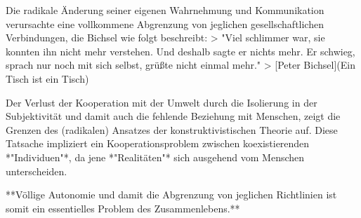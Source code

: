 Die radikale Änderung seiner eigenen Wahrnehmung und Kommunikation verursachte eine vollkommene Abgrenzung von jeglichen gesellschaftlichen Verbindungen, die Bichsel wie folgt beschreibt:
> "Viel schlimmer war, sie konnten ihn nicht mehr verstehen. Und deshalb sagte er nichts mehr. Er schwieg, sprach nur noch mit sich selbst, grüßte nicht einmal mehr."
> [Peter Bichsel](Ein Tisch ist ein Tisch)

Der Verlust der Kooperation mit der Umwelt durch die Isolierung in der Subjektivität und damit auch die fehlende Beziehung mit Menschen, zeigt die Grenzen des (radikalen) Ansatzes der konstruktivistischen Theorie auf.
Diese Tatsache impliziert ein Kooperationsproblem zwischen koexistierenden *"Individuen"*, da jene *"Realitäten"* sich ausgehend vom Menschen unterscheiden.

**Völlige Autonomie und damit die Abgrenzung von jeglichen Richtlinien ist somit ein essentielles Problem des Zusammenlebens.**
